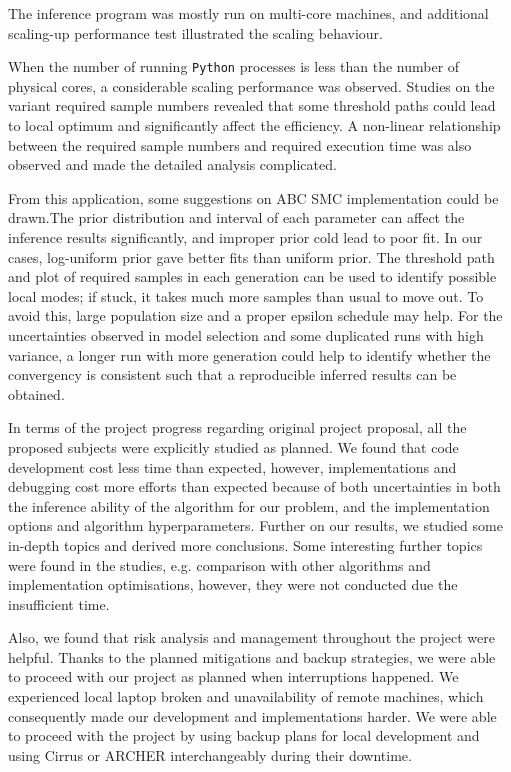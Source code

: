  The inference program was mostly run on multi-core machines, and additional scaling-up performance test illustrated the scaling behaviour. 
 
 When the number of running \verb|Python| processes is less than the number of physical cores, a considerable scaling performance was observed. Studies on the variant required sample numbers revealed that some threshold paths could lead to local optimum and significantly affect the efficiency. A non-linear relationship between the required sample numbers and required execution time was also observed and made the detailed analysis complicated. 


 From this application, some suggestions on ABC SMC implementation could be drawn.The prior distribution and interval of each parameter can affect the inference results significantly, and improper prior cold lead to poor fit. In our cases, log-uniform prior gave better fits than uniform prior. The threshold path and plot of required samples in each generation can be used to identify possible local modes; if stuck, it takes much more samples than usual to move out. To avoid this, large population size and a proper epsilon schedule may help. For the uncertainties observed in model selection and some duplicated runs with high variance, a longer run with more generation could help to identify whether the convergency is consistent such that a reproducible inferred results can be obtained.


In terms of the project progress regarding original project proposal, all the proposed subjects were explicitly studied as planned. We found that code development cost less time than expected, however, implementations and debugging cost more efforts than expected because of both uncertainties in both the inference ability of the algorithm for our problem, and the implementation options and algorithm hyperparameters. Further on our results, we studied some in-depth topics and derived more conclusions. Some interesting further topics were found in the studies, e.g. comparison with other algorithms and implementation optimisations, however, they were not conducted due the insufficient time.

Also, we found that risk analysis and management throughout the project were helpful. Thanks to the planned mitigations and backup strategies, we were able to proceed with our project as planned when interruptions happened. We experienced local laptop broken and unavailability of remote machines, which consequently made our development and implementations harder. We were able to proceed with the project by using backup plans for local development and using Cirrus or ARCHER interchangeably during their downtime.

